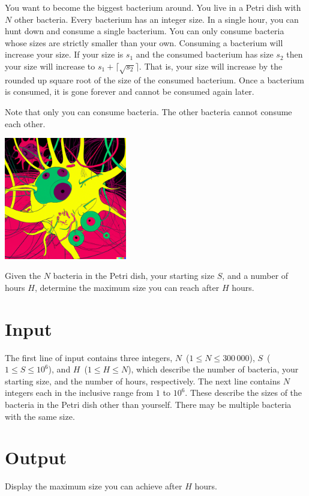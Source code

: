 
You want to become the biggest bacterium around. You live in a Petri dish with $N$ other bacteria. Every bacterium has an integer size. In a single hour, you can hunt down and consume a single bacterium. You can only consume bacteria whose sizes are strictly smaller than your own. Consuming a bacterium will increase your size. If your size is $s_1$ and the consumed bacterium has size $s_2$ then your size will increase to $s_1 + \lceil\sqrt{s_2}\rceil$. That is, your size will increase by the rounded up square root of the size of the consumed bacterium. Once a bacterium is consumed, it is gone forever and cannot be consumed again later.

Note that only you can consume bacteria. The other bacteria cannot consume each other.

\begin{center}
    \includegraphics[width=0.4\textwidth]{fig}
\end{center}

Given the $N$ bacteria in the Petri dish, your starting size $S$, and a number of hours $H$, determine the maximum size you can reach after $H$ hours.


\section*{Input}

The first line of input contains three integers, $N$~($1 \leq N \leq 300\,000$), $S$~($1 \leq S \leq 10^6$), and $H$~($1 \leq H \leq N$), which describe the number of bacteria, your starting size, and the number of hours, respectively. The next line contains $N$ integers each in the inclusive range from $1$ to $10^6$. These describe the sizes of the bacteria in the Petri dish other than yourself. There may be multiple bacteria with the same size.


\section*{Output}

Display the maximum size you can achieve after $H$ hours.
